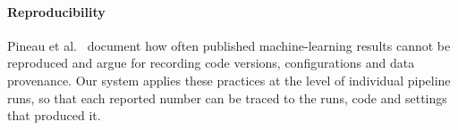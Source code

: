\paragraph{Reproducibility}
Pineau et al.~\cite{pineau2021reproducibility} document how often published
machine-learning results cannot be reproduced and argue for recording code
versions, configurations and data provenance. Our system applies these practices
at the level of individual pipeline runs, so that each reported number can be
traced to the runs, code and settings that produced it.

